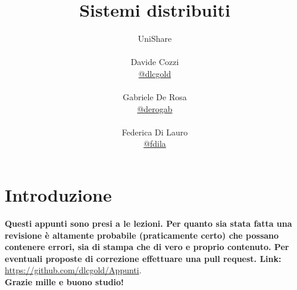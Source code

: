 \documentclass[a4paper,12pt, oneside]{book}
\title{Sistemi distribuiti}
\author{UniShare\\\\Davide Cozzi\\\href{https://t.me/dlcgold}{@dlcgold}\\\\Gabriele De Rosa\\\href{https://t.me/derogab}{@derogab} \\\\Federica Di Lauro\\\href{https://t.me/f_dila}{@f\textunderscore dila}}
\date{}
\begin{document}
\maketitle


\newtheorem{teorema}{Teorema}
\newtheorem{definizione}{Definizione}
\newtheorem{esempio}{Esempio}
\newtheorem{corollario}{Corollario}
\newtheorem{lemma}{Lemma}
\newtheorem{osservazione}{Osservazione}
\newtheorem{nota}{Nota}
\newtheorem{esercizio}{Esercizio}
\tableofcontents
\renewcommand{\chaptermark}[1]{%
\markboth{\chaptername
\ \thechapter.\ #1}{}}
\renewcommand{\sectionmark}[1]{\markright{\thesection.\ #1}}
\chapter{Introduzione}
\textbf{Questi appunti sono presi a le lezioni. Per quanto sia stata fatta una revisione è altamente probabile (praticamente certo) che possano contenere errori, sia di stampa che di vero e proprio contenuto. Per eventuali proposte di correzione effettuare una pull request. Link: } \url{https://github.com/dlcgold/Appunti}.\\
\textbf{Grazie mille e buono studio!}
\end{document}
